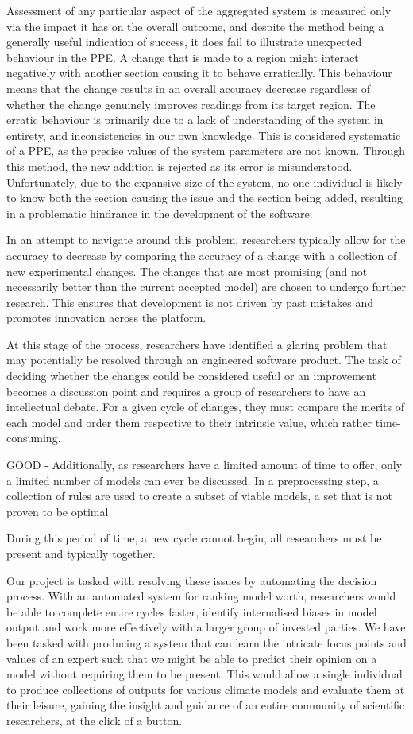 \documentclass{ecmm427_assignment}
\begin{document}
 Assessment of any particular aspect of the aggregated system is measured only via the impact it has on the overall outcome, and despite the method being a generally useful indication of success, it does fail to illustrate unexpected behaviour in the PPE. A change that is made to a region might interact negatively with another section causing it to behave erratically. This behaviour means that the change results in an overall accuracy decrease regardless of whether the change genuinely improves readings from its target region. The erratic behaviour is primarily due to a lack of understanding of the system in entirety, and inconsistencies in our own knowledge. This is considered systematic of a PPE, as the precise values of the system parameters are not known. Through this method, the new addition is rejected as its error is misunderstood. Unfortunately, due to the expansive size of the system, no one individual is likely to know both the section causing the issue and the section being added, resulting in a problematic hindrance in the development of the software.

 In an attempt to navigate around this problem, researchers typically allow for the accuracy to decrease by comparing the accuracy of a change with a collection of new experimental changes. The changes that are most promising (and not necessarily better than the current accepted model) are chosen to undergo further research. This ensures that development is not driven by past mistakes and promotes innovation across the platform.

 At this stage of the process, researchers have identified a glaring problem that may potentially be resolved through an engineered software product. The task of deciding whether the changes could be considered useful or an improvement becomes a discussion point and requires a group of researchers to have an intellectual debate. For a given cycle of changes, they must compare the merits of each model and order them respective to their intrinsic value, which rather time-consuming.
 
GOOD - Additionally, as researchers have a limited amount of time to offer, only a limited number of models can ever be discussed. In a preprocessing step, a collection of rules are used to create a subset of viable models, a set that is not proven to be optimal.
  
   During this period of time, a new cycle cannot begin, all researchers must be present and typically together.

 Our project is tasked with resolving these issues by automating the decision process. With an automated system for ranking model worth, researchers would be able to complete entire cycles faster, identify internalised biases in model output and work more effectively with a larger group of invested parties. We have been tasked with producing a system that can learn the intricate focus points and values of an expert such that we might be able to predict their opinion on a model without requiring them to be present. This would allow a single individual to produce collections of outputs for various climate models and evaluate them at their leisure, gaining the insight and guidance of an entire community of scientific researchers, at the click of a button.
\end{document}
